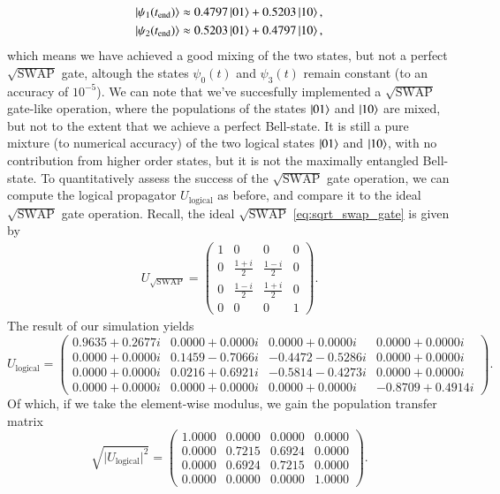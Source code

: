 \documentclass{subfiles}
\begin{document}
\begin{align*}
    \ket{\psi_1(t_{\text{end}})} &\approx 0.4797 \ket{01} + 0.5203 \ket{10}, \\
    \ket{\psi_2(t_{\text{end}})} &\approx 0.5203 \ket{01} + 0.4797 \ket{10},
\end{align*}
which means we have achieved a good mixing of the two states, but not a perfect $\sqrt{\text{SWAP}}$ gate, altough the states $\psi_0(t)$ and $\psi_3(t)$ remain constant (to an accuracy of $10^{-5}$). We can note that we've succesfully implemented a $\sqrt{\text{SWAP}}$ gate-like operation, where the populations of the states $\ket{01}$ and $\ket{10}$ are mixed, but not to the extent that we achieve a perfect Bell-state. It is still a pure mixture (to numerical accuracy) of the two logical states $\ket{01}$ and $\ket{10}$, with no contribution from higher order states, but it is not the maximally entangled Bell-state. 
To quantitatively assess the success of the $\sqrt{\text{SWAP}}$ gate operation, we can compute the logical propagator $U_{\text{logical}}$ as before, and compare it to the ideal $\sqrt{\text{SWAP}}$ gate operation. Recall, the ideal $\sqrt{\text{SWAP}}$ \ref{eq:sqrt_swap_gate} is given by 
\begin{align*}
    U_{\sqrt{\text{SWAP}}} = \begin{pmatrix}
        1 & 0 & 0 & 0 \\
        0 & \frac{1 + i}{2} & \frac{1 - i}{2} & 0 \\
        0 & \frac{1 - i}{2} & \frac{1 + i}{2} & 0 \\
        0 & 0 & 0 & 1
    \end{pmatrix}.
\end{align*}
The result of our simulation yields
\begin{equation}
U_{\mathrm{logical}}
=
\begin{pmatrix}
 0.9635 + 0.2677i & 0.0000 + 0.0000i & 0.0000 + 0.0000i & 0.0000 + 0.0000i\\
 0.0000 + 0.0000i & 0.1459 - 0.7066i & -0.4472 - 0.5286i & 0.0000 + 0.0000i\\
 0.0000 + 0.0000i & 0.0216 + 0.6921i & -0.5814 - 0.4273i & 0.0000 + 0.0000i\\
 0.0000 + 0.0000i & 0.0000 + 0.0000i & 0.0000 + 0.0000i & -0.8709 + 0.4914i
\end{pmatrix}.
\end{equation}
Of which, if we take the element-wise modulus, we gain the population transfer matrix
\begin{equation}
\sqrt{\lvert U_{\mathrm{logical}}\rvert^2}
=\begin{pmatrix}
1.0000 & 0.0000 & 0.0000 & 0.0000\\
0.0000 & 0.7215 & 0.6924 & 0.0000\\
0.0000 & 0.6924 & 0.7215 & 0.0000\\
0.0000 & 0.0000 & 0.0000 & 1.0000
\end{pmatrix}.
\end{equation}
\end{document}
